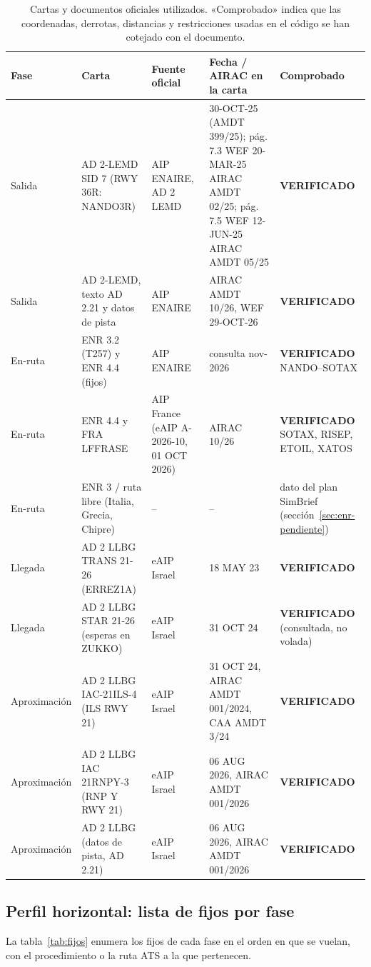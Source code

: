 \documentclass[11pt,a4paper]{article}
\newcommand{\ok}{\textcolor{green!50!black}{\textbf{VERIFICADO}}}
\begin{document}
\begin{table}[!htbp]\centering\footnotesize
\begin{tabularx}{\linewidth}{lL{4.0cm}L{2.6cm}YL{2.5cm}}\toprule
Fase & Carta & Fuente oficial & Fecha / AIRAC en la carta & Comprobado\\ \midrule
Salida & AD 2-LEMD SID 7 (RWY 36R: NANDO3R) & AIP ENAIRE, AD 2 LEMD & 30-OCT-25 (AMDT 399/25); pág. 7.3 WEF 20-MAR-25 AIRAC AMDT 02/25; pág. 7.5 WEF 12-JUN-25 AIRAC AMDT 05/25 & \ok\\
Salida & AD 2-LEMD, texto AD 2.21 y datos de pista & AIP ENAIRE & AIRAC AMDT 10/26, WEF 29-OCT-26 & \ok\\
En-ruta & ENR 3.2 (T257) y ENR 4.4 (fijos) & AIP ENAIRE & consulta nov-2026 & \ok{} NANDO--SOTAX\\
En-ruta & ENR 4.4 y FRA LFFRASE & AIP France (eAIP A-2026-10, 01 OCT 2026) & AIRAC 10/26 & \ok{} SOTAX, RISEP, ETOIL, XATOS\\
En-ruta & ENR 3 / ruta libre (Italia, Grecia, Chipre) & -- & -- & dato del plan SimBrief (sección~\ref{sec:enr-pendiente})\\
Llegada & AD 2 LLBG TRANS 21-26 (ERREZ1A) & eAIP Israel & 18 MAY 23 & \ok\\
Llegada & AD 2 LLBG STAR 21-26 (esperas en ZUKKO) & eAIP Israel & 31 OCT 24 & \ok{} (consultada, no volada)\\
Aproximación & AD 2 LLBG IAC-21ILS-4 (ILS RWY 21) & eAIP Israel & 31 OCT 24, AIRAC AMDT 001/2024, CAA AMDT 3/24 & \ok\\
Aproximación & AD 2 LLBG IAC 21RNPY-3 (RNP Y RWY 21) & eAIP Israel & 06 AUG 2026, AIRAC AMDT 001/2026 & \ok\\
Aproximación & AD 2 LLBG (datos de pista, AD 2.21) & eAIP Israel & 06 AUG 2026, AIRAC AMDT 001/2026 & \ok\\ \bottomrule
\end{tabularx}
\caption{Cartas y documentos oficiales utilizados. «Comprobado» indica que las coordenadas, derrotas, distancias y restricciones usadas en el código se han cotejado con el documento.}
\label{tab:cartas}
\end{table}

\subsection{Perfil horizontal: lista de fijos por fase}

La tabla~\ref{tab:fijos} enumera los fijos de cada fase en el orden en que se vuelan, con el procedimiento o la ruta ATS a la que pertenecen.
\end{document}
